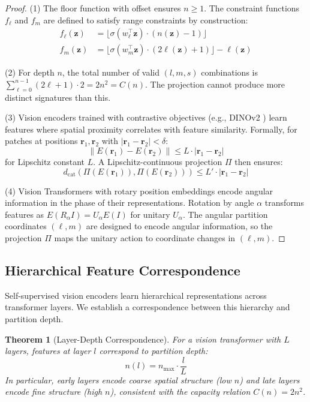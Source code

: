 \documentclass[11pt,a4paper]{article}
\newtheorem{theorem}{Theorem}[section]
\theoremstyle{definition}
\theoremstyle{remark}
\newcommand{\dcat}{d_{\mathrm{cat}}}
\begin{document}
\begin{proof}
(1) The floor function with offset ensures $n \geq 1$. The constraint functions $f_\ell$ and $f_m$ are defined to satisfy range constraints by construction:
\begin{align}
f_\ell(\mathbf{z}) &= \lfloor \sigma(w_\ell^\top \mathbf{z}) \cdot (n(\mathbf{z}) - 1) \rfloor \\
f_m(\mathbf{z}) &= \lfloor \sigma(w_m^\top \mathbf{z}) \cdot (2\ell(\mathbf{z}) + 1) \rfloor - \ell(\mathbf{z})
\end{align}

(2) For depth $n$, the total number of valid $(l, m, s)$ combinations is $\sum_{\ell=0}^{n-1} (2\ell + 1) \cdot 2 = 2n^2 = C(n)$. The projection cannot produce more distinct signatures than this.

(3) Vision encoders trained with contrastive objectives (e.g., DINOv2 \cite{Oquab2024}) learn features where spatial proximity correlates with feature similarity. Formally, for patches at positions $\mathbf{r}_1, \mathbf{r}_2$ with $|\mathbf{r}_1 - \mathbf{r}_2| < \delta$:
\begin{equation}
\|E(\mathbf{r}_1) - E(\mathbf{r}_2)\| \leq L \cdot |\mathbf{r}_1 - \mathbf{r}_2|
\end{equation}
for Lipschitz constant $L$. A Lipschitz-continuous projection $\Pi$ then ensures:
\begin{equation}
\dcat(\Pi(E(\mathbf{r}_1)), \Pi(E(\mathbf{r}_2))) \leq L' \cdot |\mathbf{r}_1 - \mathbf{r}_2|
\end{equation}

(4) Vision Transformers with rotary position embeddings encode angular information in the phase of their representations. Rotation by angle $\alpha$ transforms features as $E(R_\alpha I) = U_\alpha E(I)$ for unitary $U_\alpha$. The angular partition coordinates $(\ell, m)$ are designed to encode angular information, so the projection $\Pi$ maps the unitary action to coordinate changes in $(\ell, m)$.
\end{proof}

\subsection{Hierarchical Feature Correspondence}

Self-supervised vision encoders learn hierarchical representations across transformer layers. We establish a correspondence between this hierarchy and partition depth.

\begin{theorem}[Layer-Depth Correspondence]
\label{thm:layer_depth}
For a vision transformer with $L$ layers, features at layer $l$ correspond to partition depth:
\begin{equation}
n(l) = n_{\max} \cdot \frac{l}{L}
\end{equation}
In particular, early layers encode coarse spatial structure (low $n$) and late layers encode fine structure (high $n$), consistent with the capacity relation $C(n) = 2n^2$.
\end{theorem}
\end{document}
